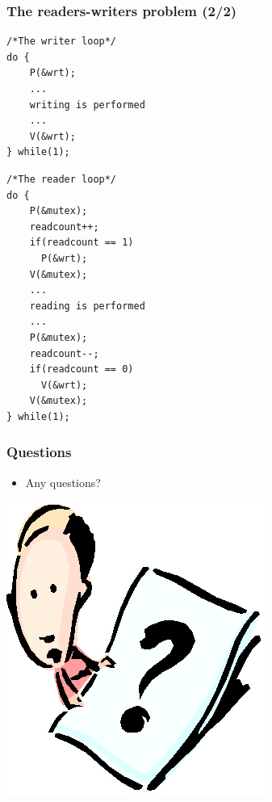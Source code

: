 \documentclass[CJKutf8,xcolor=pdftex,dvipsnames,table]{beamer}
\begin{document}
\begin{CJK*}{UTF8}{song}
  \begin{frame}[fragile]
  \frametitle{The readers-writers problem (2/2)} \pause
  \begin{minipage}[c]{0.5\textwidth}

\begin{lstlisting}
/*The writer loop*/
do {
    P(&wrt);
    ...
    writing is performed
    ...
    V(&wrt);
} while(1);
\end{lstlisting}

  \end{minipage}%
  \pause
  \begin{minipage}[c]{0.5\textwidth}

\begin{lstlisting}
/*The reader loop*/
do {
    P(&mutex);
    readcount++;
    if(readcount == 1)
      P(&wrt);
    V(&mutex);
    ...
    reading is performed
    ...
    P(&mutex);
    readcount--;
    if(readcount == 0)
      V(&wrt);
    V(&mutex);
} while(1);
\end{lstlisting}

  \end{minipage}

\end{frame}

  \begin{frame}
  \frametitle{Questions}
  \begin{itemize}
  \item{Any questions?}
  \end{itemize}
  \begin{center}
    \includegraphics[scale=.5]{question}
  \end{center}
  \end{frame}


\end{CJK*}
\end{document}
